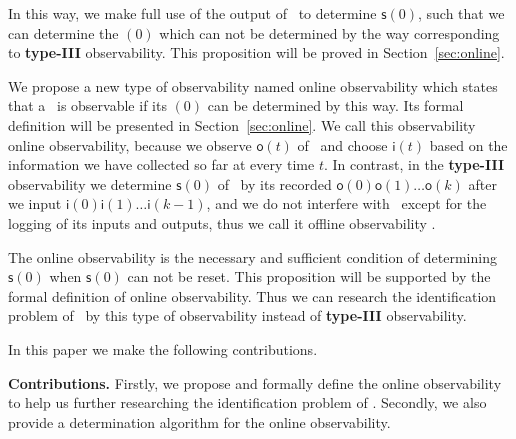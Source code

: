  In this way, we make full use of the output of \BCN\ to determine $\mathsf{s}(0)$, such that we can determine the \State$(0)$ which can not be determined by the way corresponding to {\bf type-III} observability. This proposition will be proved in Section~\ref{sec:online}. 
 
 We propose a new type of observability named online observability which states that a \BCN\ is observable if its \State$(0)$ can be determined by this way. Its formal definition will be presented in Section~\ref{sec:online}. We call this observability online observability, because we observe $\mathsf{o}(t)$ of \BCN\ and choose $\mathsf{i}(t)$ based on the information we have collected so far at every time $t$. In contrast, in the {\bf type-III} observability we determine $\mathsf{s}(0)$ of \BCN\ by its recorded $\mathsf{o}(0)\mathsf{o}(1)\ldots\mathsf{o}(k)$ after we input $\mathsf{i}(0)\mathsf{i}(1)\ldots\mathsf{i}(k-1)$, and  we do not interfere with \BCN\ except for the logging of its inputs and outputs, thus we call it offline observability \cite{Cassar2017A}.
 
  The online observability is the necessary and sufficient condition of determining $\mathsf{s}(0)$ when $\mathsf{s}(0)$ can not be reset. This proposition will be supported by the formal definition of  online observability.  Thus we can research the identification problem of \BCNs\ by this type of observability instead of {\bf type-III} observability.





In this paper we make the following contributions.

\medskip\noindent
{\bf Contributions.}
Firstly, we propose and formally define the online observability to help us further researching the identification problem of \BCN. %
Secondly, we also provide a determination algorithm for the online observability. %

